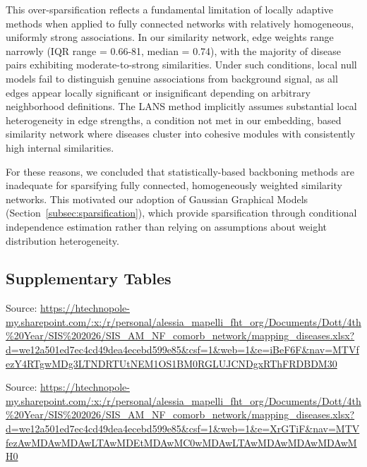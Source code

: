 This over-sparsification reflects a fundamental limitation of locally adaptive methods when applied to fully connected networks with relatively homogeneous, uniformly strong associations. In our similarity network, edge weights range narrowly (IQR range = 0.66-81, median = 0.74), with the majority of disease pairs exhibiting moderate-to-strong similarities. Under such conditions, local null models fail to distinguish genuine associations from background signal, as all edges appear locally significant or insignificant depending on arbitrary neighborhood definitions. The LANS method implicitly assumes substantial local heterogeneity in edge strengths, a condition not met in our embedding, based similarity network where diseases cluster into cohesive modules with consistently high internal similarities.

For these reasons, we concluded that statistically-based backboning methods are inadequate for sparsifying fully connected, homogeneously weighted similarity networks. This motivated our adoption of Gaussian Graphical Models (Section~\ref{subsec:sparsification}), which provide sparsification through conditional independence estimation rather than relying on assumptions about weight distribution heterogeneity.

\newpage
\subsection*{Supplementary Tables}
\begin{table}[h]
\centering
\caption{Cardiometabolic phenotypes definition with lifecourse incidence main diseases.}
\label{ST:table1}
\vspace{2mm}
\footnotesize Source: \url{https://htechnopole-my.sharepoint.com/:x:/r/personal/alessia_mapelli_fht_org/Documents/Dott/4th%20Year/SIS%202026/SIS_AM_NF_comorb_network/mapping_diseases.xlsx?d=we12a501ed7ec4cd49dea4ecebd599e85&csf=1&web=1&e=iBeF6F&nav=MTVfezY4RTgwMDg3LTNDRTUtNEM1OS1BM0RGLUJCNDgxRThFRDBDM30}
\end{table}

\begin{table}[h]
\centering
\caption{Risk factors phenotypes definition}
\label{ST:table2}
\vspace{2mm}
\footnotesize Source: \url{https://htechnopole-my.sharepoint.com/:x:/r/personal/alessia_mapelli_fht_org/Documents/Dott/4th%20Year/SIS%202026/SIS_AM_NF_comorb_network/mapping_diseases.xlsx?d=we12a501ed7ec4cd49dea4ecebd599e85&csf=1&web=1&e=XrGTiF&nav=MTVfezAwMDAwMDAwLTAwMDEtMDAwMC0wMDAwLTAwMDAwMDAwMDAwMH0}
\end{table}

